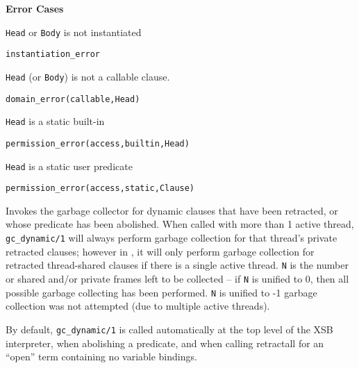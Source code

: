 \begin{description}
{\bf Error Cases}
\bi
\item 	{\tt Head} or {\tt Body} is not instantiated
\bi
\item 	{\tt instantiation\_error}
\ei
%
\item 	{\tt Head} (or {\tt Body}) is not a callable clause.
\bi
\item 	{\tt domain\_error(callable,Head)}
\ei
%
\item 	{\tt Head} is a static built-in
\bi
\item 	{\tt permission\_error(access,builtin,Head)}
\ei
\item 	{\tt Head} is a static user predicate
\bi
\item 	{\tt permission\_error(access,static,Clause)}
\ei
%
\ei

%
Invokes the garbage collector for dynamic clauses that have been
retracted, or whose predicate has been abolished.  When called with
more than 1 active thread, {\tt gc\_dynamic/1} will always perform
garbage collection for that thread's private retracted clauses;
however in \version{}, it will only perform garbage collection for
retracted thread-shared clauses if there is a single active thread.
{\tt N} is the number or shared and/or private frames left to be
collected -- if {\tt N} is unified to 0, then all possible garbage
collecting has been performed.  {\tt N} is unified to -1 garbage
collection was not attempted (due to multiple active threads).

By default, {\tt gc\_dynamic/1} is called automatically at the top
level of the XSB interpreter, when abolishing a predicate, and when
calling retractall for an ``open'' term containing no variable
bindings.

\end{description}
